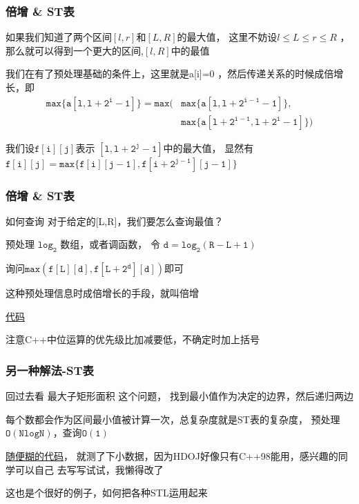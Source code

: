 \documentclass{beamer}
\begin{document}
  \begin{frame}[fragile]
    \frametitle{倍增 \& ST表}

    如果我们知道了两个区间$[l,r]$和$[L,R]$的最大值，
    这里不妨设$l \leq L \leq r \leq R$
    ，那么就可以得到一个更大的区间,$[l,R]$中的最值

    \pause

    \vspace*{1\baselineskip}

    我们在有了预处理基础的条件上，这里就是a[i]=0
    ，然后传递关系的时候成倍增长，即
    \begin{align*}
      \mathtt{max\{a[l,l+2^i-1]\}=max(}
      &\mathtt{max\{a[l,l+2^{i-1}-1]\},} \\
      & \mathtt{max\{a[l+2^{i-1},l+2^i-1]\})}
    \end{align*}

    我们设$\mathtt{f[i][j]}$表示 $\mathtt{[l,l+2^j-1]}$中的最大值，
    显然有
    $\mathtt{f[i][j]=max\{f[i][j-1],f[i+2^{j-1}][j-1]\}}$
  \end{frame}

  \begin{frame}
    \frametitle{倍增 \& ST表}
    \begin{block}{如何查询}
      对于给定的[L,R]，我们要怎么查询最值？
    \end{block}

    \pause

    预处理 $\mathtt{log_2}$ 数组，或者调函数，
    令 $\mathtt{d=log_2{(R-L+1)}}$

    询问$\mathtt{max(f[L][d],f[L+2^d][d])}$即可

    \vspace*{1\baselineskip}
    
    这种预处理信息时成倍增长的手段，就叫倍增

    \vspace*{1\baselineskip}

    \href{http://syh521.cn/file/st-table.cpp}{代码}

    注意C++中位运算的优先级比加减要低，不确定时加上括号
  \end{frame}


  \begin{frame}
    \frametitle{另一种解法-ST表}
    回过去看 最大子矩形面积 这个问题，
    找到最小值作为决定的边界，然后递归两边

    每个数都会作为区间最小值被计算一次，总复杂度就是ST表的复杂度，
    预处理$\mathtt{O(NlogN)}$，查询$\mathtt{O(1)}$

    \vspace*{1\baselineskip}

    \href{http://syh521.cn/file/another-1.cpp}{随便糊的代码}，
    就测了下小数据，因为HDOJ好像只有C++98能用，感兴趣的同学可以自己
    去写写试试，我懒得改了

    这也是个很好的例子，如何把各种STL运用起来


  \end{frame}
\end{document}
